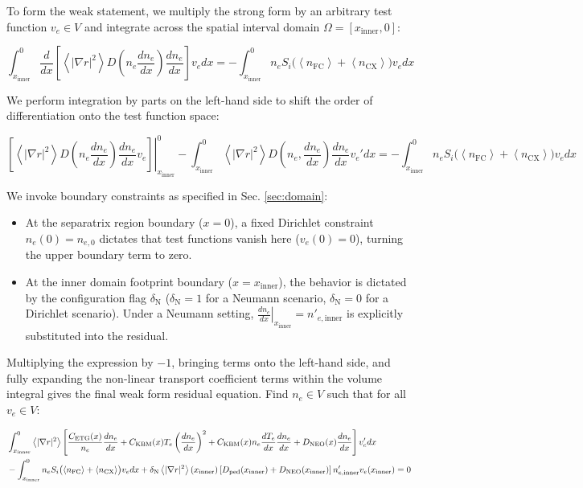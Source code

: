 \documentclass[twocolumn,secnumarabic,amssymb, nobibnotes, aps, prd]{revtex4-2}
\renewcommand{\ne}{n_{e}}  %
\newcommand{\nfc}{n_{\mathrm{FC}}}
\newcommand{\ncx}{n_{\mathrm{CX}}}
\newcommand{\Si}{S_{i}}
\newcommand{\Dped}{D_{\mathrm{ped}}}
\newcommand{\fsa}[1]{\left\langle #1 \right\rangle}
\newcommand{\gradrsq}{\fsa{|\nabla r|^{2}}}
\newcommand{\xin}{x_{\mathrm{inner}}}
\begin{document}
To form the weak statement, we multiply the strong form by an arbitrary test function $v_e \in V$ and integrate across the spatial interval domain $\Omega = [\xin, 0]$:
\begin{widetext}
\begin{equation}
\int_{\xin}^{0} \frac{d}{dx}\left[\gradrsq D\left(\ne \frac{d\ne}{dx}\right) \frac{d\ne}{dx}\right] v_e  dx = -\int_{\xin}^{0} \ne\Si\bigl(\fsa{\nfc}+\fsa{\ncx}\bigr) v_e dx
\end{equation}
\end{widetext}

We perform integration by parts on the left-hand side to shift the order of differentiation onto the test function space:
\begin{widetext}
\begin{equation}
\left.\left[\gradrsq D\left(\ne \frac{d\ne}{dx}\right) \frac{d\ne}{dx} v_e\right]\right|_{\xin}^{0} - \int_{\xin}^{0} \gradrsq D\left(\ne, \frac{d\ne}{dx}\right) \frac{d\ne}{dx} v_e'  dx = -\int_{\xin}^{0} \ne\Si\bigl(\fsa{\nfc}+\fsa{\ncx}\bigr) v_e  dx
\end{equation}
\end{widetext}

We invoke boundary constraints as specified in Sec. \ref{sec:domain}:
\begin{itemize}
\item At the separatrix region boundary ($x=0$), a fixed Dirichlet constraint $\ne(0) = n_{e,0}$ dictates that test functions vanish here ($v_e(0) = 0$), turning the upper boundary term to zero.
\item At the inner domain footprint boundary ($x=\xin$), the behavior is dictated by the configuration flag $\delta_{\mathrm{N}}$ ($\delta_{\mathrm{N}}=1$ for a Neumann scenario, $\delta_{\mathrm{N}}=0$ for a Dirichlet scenario). Under a Neumann setting, $\left.\frac{d\ne}{dx}\right|_{\xin} = n'_{e,\mathrm{inner}}$ is explicitly substituted into the residual.
\end{itemize}

Multiplying the expression by $-1$, bringing terms onto the left-hand side, and fully expanding the non-linear transport coefficient terms within the volume integral gives the final weak form residual equation. Find $\ne \in V$ such that for all $v_e \in V$:
\begin{widetext}
\begin{align}
& \int_{\xin}^{0} \gradrsq \left[ \frac{C_{\mathrm{ETG}}(x)}{\ne} \frac{d\ne}{dx} + C_{\mathrm{KBM}}(x) T_e \left(\frac{d\ne}{dx}\right)^2 + C_{\mathrm{KBM}}(x) \ne \frac{dT_e}{dx} \frac{d\ne}{dx} + D_{\mathrm{NEO}}(x) \frac{d\ne}{dx} \right] v_e'  dx 
\notag \\ & - \int_{\xin}^{0} \ne\Si\bigl(\fsa{\nfc}+\fsa{\ncx}\bigr) v_e dx + \delta_{\mathrm{N}}\gradrsq(\xin)\left[\Dped(\xin) + D_{\mathrm{NEO}}(\xin)\right] n'_{e,\mathrm{inner}} v_e(\xin) = 0
\end{align}
\end{widetext}
\end{document}
